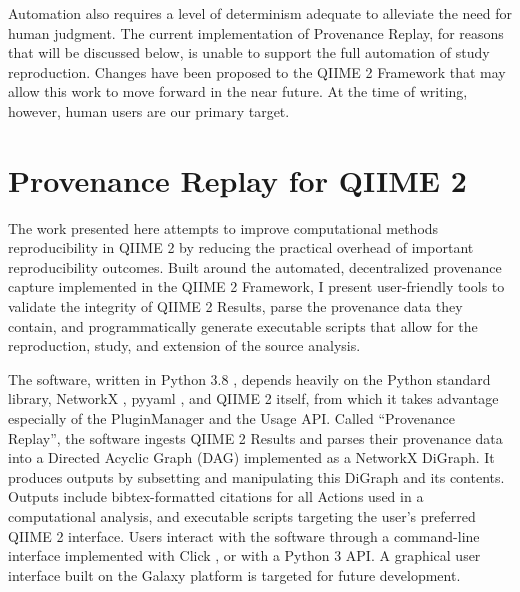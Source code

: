 Automation also requires a level of determinism adequate to alleviate the need
for human judgment. The current implementation of Provenance Replay, for reasons
that will be discussed below, is unable to support the full automation of study
reproduction. Changes have been proposed to the QIIME 2 Framework that may allow
this work to move forward in the near future. At the time of writing, however,
human users are our primary target.


\section{Provenance Replay for QIIME 2}

The work presented here attempts to improve computational methods
reproducibility in QIIME 2 by reducing the practical overhead of important
reproducibility outcomes. Built around the automated, decentralized provenance
capture implemented in the QIIME 2 Framework, I present user-friendly tools to
validate the integrity of QIIME 2 Results, parse the provenance data they
contain, and programmatically generate executable scripts that allow for the
reproduction, study, and extension of the source analysis.

The software, written in Python 3.8 \parencite{python_software_foundation_python_2001},
depends heavily on the Python standard library, NetworkX \parencite{hagberg_exploring_2008},
pyyaml \parencite{simonov_pyyaml_2006}, and QIIME 2 itself, from which it takes
advantage especially of the PluginManager and the Usage API. Called “Provenance
Replay”, the software ingests QIIME 2 Results and parses their provenance data
into a Directed Acyclic Graph (DAG) implemented as a NetworkX DiGraph. It
produces outputs by subsetting and manipulating this DiGraph and its contents.
Outputs include bibtex-formatted \parencite{boulogne_bibtexparser_nodate}
citations for all Actions used in a computational analysis, and executable
scripts targeting the user’s preferred QIIME 2 interface. Users interact with
the software through a command-line interface implemented with Click \parencite{pallets_click_2014},
or with a Python 3 API. A graphical user interface built on the Galaxy platform
\parencite{afgan_galaxy_2018} is targeted for future development.
